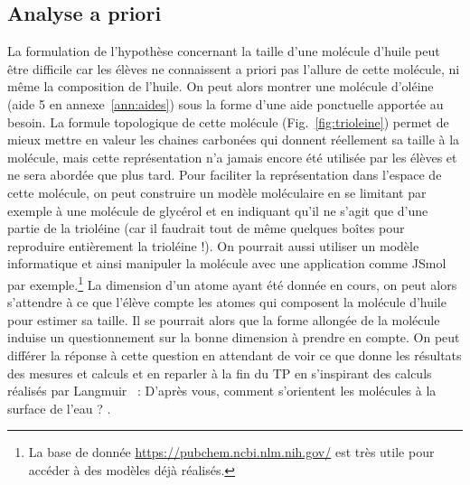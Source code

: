 \documentclass[12pt,a4paper]{article}
\begin{document}
\subsection{Analyse a priori}

La formulation de l'hypothèse concernant la taille d'une molécule d'huile peut être difficile car les élèves ne connaissent a priori pas l'allure de cette molécule, ni même la composition de l'huile.
On peut alors montrer une molécule d'oléine (aide 5 en annexe~\ref{ann:aides}) sous la forme d'une aide ponctuelle apportée au besoin.
La formule topologique de cette molécule (Fig.~\ref{fig:trioleine}) permet de mieux mettre en valeur les chaines carbonées qui donnent réellement sa taille à la molécule, mais cette représentation n'a jamais encore été utilisée par les élèves et ne sera abordée que plus tard.
Pour faciliter la représentation dans l'espace de cette molécule, on peut construire un modèle moléculaire en se limitant par exemple à une molécule de glycérol et en indiquant qu'il ne s'agit que d'une partie de la trioléine (car il faudrait tout de même quelques boîtes pour reproduire entièrement la trioléine !).
On pourrait aussi utiliser un modèle informatique et ainsi \og manipuler \fg{} la molécule avec une application comme JSmol par exemple.\footnote{La base de donnée \href{https://pubchem.ncbi.nlm.nih.gov/}{https://pubchem.ncbi.nlm.nih.gov/} est très utile pour accéder à des modèles déjà réalisés.}
La dimension d'un atome ayant été donnée en cours, on peut alors s'attendre à ce que l'élève compte les atomes qui composent la \og molécule d'huile \fg{} pour estimer sa taille.
Il se pourrait alors que la forme allongée de la molécule induise un questionnement sur la bonne dimension à prendre en compte.
On peut différer la réponse à cette question en attendant de voir ce que donne les résultats des mesures et calculs et en reparler à la fin du TP en s'inspirant des calculs réalisés par Langmuir~\cite{Langmuir1917} : \og D'après vous, comment s'orientent les molécules à la surface de l'eau ? \fg{}.
\end{document}
